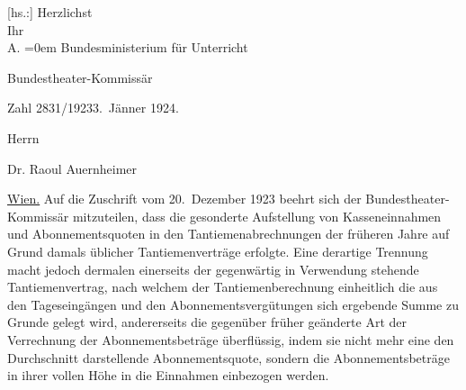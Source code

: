 \pstart
           {[}hs.:{]} Herzlichst{\\[\baselineskip]}Ihr{\\[\baselineskip]}\spacefill\mbox{A.}\pend
           \leftskip=0em{}\vspace{1em}{\vspace{1\baselineskip}}
\pstart
           \raggedleft{}{\pb}Bundesministerium für Unterricht\pend
           
\pstart
           \raggedleft{}Bundestheater-Kommissär\pend
           
\pstart
           Zahl 2831/1923\hfill 3. Jänner 1924.\pend
           
\pstart
           Herrn\pend
           
\pstart
           Dr. Raoul Auernheimer\pend
           
\pstart
           \uline{Wien.}\pend
           \vspace{0.5em}
\pstart
           Auf die Zuschrift vom 20. Dezember 1923 beehrt sich der Bundestheater-Kommissär
               mitzuteilen, dass die gesonderte Aufstellung von Kasseneinnahmen und
               Abonnementsquoten in den Tantiemenabrechnungen der früheren Jahre auf Grund damals
               üblicher Tantiemenverträge erfolgte. Eine derartige Trennung macht jedoch dermalen
               einerseits der gegenwärtig in Verwendung stehende Tantiemenvertrag, nach welchem der
               Tantiemenberechnung einheitlich die aus den Tageseingängen und den
               Abonnementsvergütungen sich ergebende Summe zu Grunde gelegt wird, andererseits die
               gegenüber früher geänderte Art der Verrechnung der Abonnementsbeträge überflüssig,
                  {\pb}indem sie nicht mehr eine den Durchschnitt
               darstellende  Abonnementsquote, sondern die
               Abonnementsbeträge in ihrer vollen Höhe in die Einnahmen einbezogen werden.\pend
           
